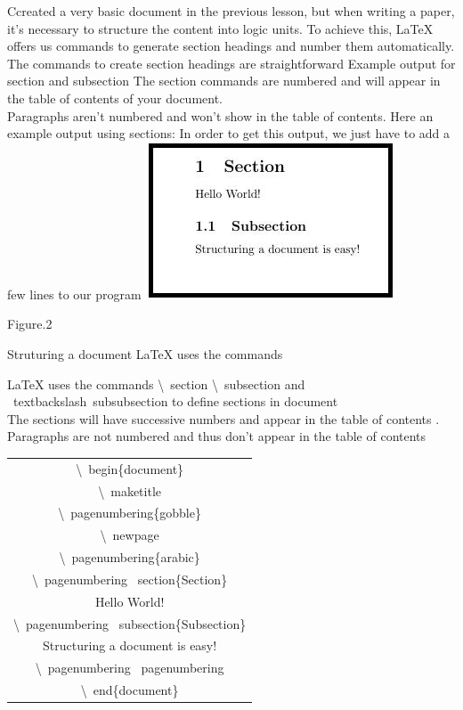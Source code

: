 \documentclass[onecolumn,journal] {IEEEtran}
\begin{document}
\begin{flushleft}
Ccreated a very basic document in the previous lesson, but when writing a paper, it's necessary to structure the content into logic units. To achieve this, LaTeX offers us commands to generate section headings and number them automatically. The commands to create section headings are straightforward
\newline
\newline
Example output for section and subsection
The section commands are numbered and will appear in the table of contents of your document.\\
 Paragraphs aren't numbered and won't show in the table of contents. Here an example output using sections:
In order to get this output, we just have to add a few lines to our program 
\center
  \includegraphics[width=5 cm]{dis5.jpg}


\begin{center}
Figure.2

\end{center}

\begin{flushleft}
Struturing a document LaTeX uses the commands
\newline

LaTeX uses the commands \textbackslash \ section \textbackslash   \ subsection and  \ textbackslash\ subsubsection to define sections in  document\\
The sections will have successive numbers and appear in the table of contents .
Paragraphs are not numbered and thus don't appear in the table of contents \\
\end{flushleft}

\begin{center}

\begin{tabular}{ |c| } 

\hline
\newline
\textbackslash  \ begin\{document\}\\
\textbackslash   \ maketitle \\
 \textbackslash \ pagenumbering\{gobble\} \\
\textbackslash  \ newpage \\
 \textbackslash \ pagenumbering\{arabic\} \\  
 \textbackslash  \ pagenumbering  \ section\{Section\} \\
Hello World! \\
\textbackslash \ pagenumbering  \ subsection\{Subsection\} \\
 Structuring a document is easy! \\
\textbackslash \ pagenumbering \ pagenumbering\\  
\textbackslash \ end\{document\} \\
 \hline


\end{tabular}
\end{center}
\end{flushleft}
\end{document}
